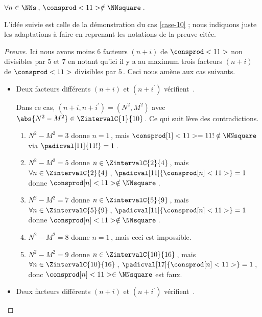 \begin{fact} \label{case-11}
	 $\forall n \in \NNs$\,, $\consprod<11> \notin \NNsquare$\,.
\end{fact}



L'idée suivie est celle de la démonstration du cas \ref{case-10} ; nous indiquons juste les adaptations à faire en reprenant les notations de la preuve citée.


\begin{proof}[Preuve]%
    Ici nous avons moins $6$ facteurs $(n + i)$ de $\consprod<11>$ non divisibles par $5$ et $7$ en notant qu'ici il y a au maximum trois facteurs $(n + i)$ de $\consprod<11>$ divisibles par $5$\,. Ceci nous amène aux cas suivants.
    \begin{itemize}
    	\medskip
		\item Deux facteurs différents $(n+i)$ et $(n+i^\prime)$ vérifient \,.
		
		\smallskip
		\noindent
		Dans ce cas, $(n+i, n+i^\prime) = (N^2, M^2)$ avec $\abs{N^2 - M^2} \in \ZintervalC{1}{10}$\,. Ce qui suit lève des contradictions.
		\begin{enumerate}
			\item $N^2 - M^2 = 3$ donne $n = 1$\,, mais $\consprod[1]<11> = 11 ! \notin \NNsquare$ via $\padicval[11]{11!} = 1$\,.


			\item $N^2 - M^2 = 5$ donne $n \in \ZintervalC{2}{4}$\,, mais $\forall n \in \ZintervalC{2}{4}$\,, $\padicval[11]{\consprod[n]<11>} = 1$ donne $\consprod[n]<11> \notin \NNsquare$\,.
			

			\item $N^2 - M^2 = 7$ donne $n \in \ZintervalC{5}{9}$\,, mais $\forall n \in \ZintervalC{5}{9}$\,, $\padicval[11]{\consprod[n]<11>} = 1$ donne $\consprod[n]<11> \notin \NNsquare$\,.


			\item $N^2 - M^2 = 8$ donne $n = 1$\,, mais ceci est impossible.

			\item $N^2 - M^2 = 9$ donne $n \in \ZintervalC{10}{16}$\,, mais $\forall n \in \ZintervalC{10}{16}$\,, $\padicval[17]{\consprod[n]<11>} = 1$\,, donc $\consprod[n]<11> \in \NNsquare$ est faux.
		\end{enumerate}


    	\medskip
		\item Deux facteurs différents $(n+i)$ et $(n+i^\prime)$ vérifient \,.
		

\end{itemize}
\end{proof}
